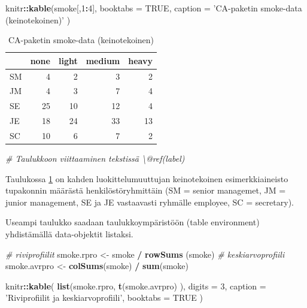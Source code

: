 \documentclass[finnish,]{book}
\newenvironment{Shaded}{\begin{snugshade}}{\end{snugshade}}
\newcommand{\CommentTok}[1]{\textcolor[rgb]{0.56,0.35,0.01}{\textit{#1}}}
\newcommand{\DataTypeTok}[1]{\textcolor[rgb]{0.13,0.29,0.53}{#1}}
\newcommand{\DecValTok}[1]{\textcolor[rgb]{0.00,0.00,0.81}{#1}}
\newcommand{\KeywordTok}[1]{\textcolor[rgb]{0.13,0.29,0.53}{\textbf{#1}}}
\newcommand{\NormalTok}[1]{#1}
\newcommand{\OperatorTok}[1]{\textcolor[rgb]{0.81,0.36,0.00}{\textbf{#1}}}
\newcommand{\OtherTok}[1]{\textcolor[rgb]{0.56,0.35,0.01}{#1}}
\newcommand{\StringTok}[1]{\textcolor[rgb]{0.31,0.60,0.02}{#1}}
\theoremstyle{definition}
\theoremstyle{definition}
\theoremstyle{definition}
\theoremstyle{remark}
\begin{document}
\begin{Shaded}
\begin{Highlighting}[]
\NormalTok{knitr}\OperatorTok{::}\KeywordTok{kable}\NormalTok{(smoke[,}\DecValTok{1}\OperatorTok{:}\DecValTok{4}\NormalTok{], }\DataTypeTok{booktabs =} \OtherTok{TRUE}\NormalTok{,}
  \DataTypeTok{caption =} \StringTok{'CA-paketin smoke-data (keinotekoinen)'}
\NormalTok{)}
\end{Highlighting}
\end{Shaded}

\begin{table}

\caption{\label{tab:smoketable1}CA-paketin smoke-data (keinotekoinen)}
\centering
\begin{tabular}[t]{lrrrr}
\toprule
  & none & light & medium & heavy\\
\midrule
SM & 4 & 2 & 3 & 2\\
JM & 4 & 3 & 7 & 4\\
SE & 25 & 10 & 12 & 4\\
JE & 18 & 24 & 33 & 13\\
SC & 10 & 6 & 7 & 2\\
\bottomrule
\end{tabular}
\end{table}

\begin{Shaded}
\begin{Highlighting}[]
\CommentTok{# Taulukkoon viittaaminen tekstissä \textbackslash{}@ref(label)}
\end{Highlighting}
\end{Shaded}

Taulukossa \ref{tab:smoketable1} on kahden luokittelumuuttujan
keinotekoinen esimerkkiaineisto tupakonnin määrästä henkilöstöryhmittäin
(SM = senior managemet, JM = junior management, SE ja JE vastaavasti
ryhmälle employee, SC = secretary).

Useampi taulukko saadaan taulukkoympäristöön (table environment)
yhdistämällä data-objektit listaksi.

\begin{Shaded}
\begin{Highlighting}[]
\CommentTok{# riviprofiilit}
\NormalTok{smoke.rpro <-}\StringTok{ }\NormalTok{smoke }\OperatorTok{/}\StringTok{ }\KeywordTok{rowSums}\NormalTok{ (smoke)}
\CommentTok{# keskiarvoprofiili}
\NormalTok{smoke.avrpro <-}\StringTok{ }\KeywordTok{colSums}\NormalTok{(smoke) }\OperatorTok{/}\StringTok{ }\KeywordTok{sum}\NormalTok{(smoke)}

\NormalTok{knitr}\OperatorTok{::}\KeywordTok{kable}\NormalTok{(}
  \KeywordTok{list}\NormalTok{(smoke.rpro, }\KeywordTok{t}\NormalTok{(smoke.avrpro)   ), }\DataTypeTok{digits =} \DecValTok{3}\NormalTok{,}
  \DataTypeTok{caption =} \StringTok{'Riviprofiilit ja keskiarvoprofiili'}\NormalTok{, }\DataTypeTok{booktabs =} \OtherTok{TRUE}
\NormalTok{)}
\end{Highlighting}
\end{Shaded}
\end{document}
